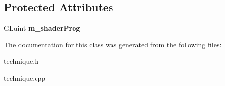 \subsection*{Protected Attributes}
\begin{DoxyCompactItemize}
\item 
\hypertarget{classTechnique_aa8c85adee2e88ac33e334986059a2ee3}{G\-Luint {\bfseries m\-\_\-shader\-Prog}}\label{classTechnique_aa8c85adee2e88ac33e334986059a2ee3}

\end{DoxyCompactItemize}


The documentation for this class was generated from the following files\-:\begin{DoxyCompactItemize}
\item 
technique.\-h\item 
technique.\-cpp\end{DoxyCompactItemize}
